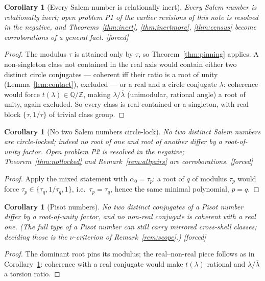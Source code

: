\documentclass[11pt]{article}
\theoremstyle{plain}
\newtheorem{corollary}[theorem]{Corollary}
\theoremstyle{definition}
\theoremstyle{remark}
\newcommand{\Q}{\mathbb{Q}}
\newcommand{\Z}{\mathbb{Z}}
\newcommand{\F}{\textnormal{[forced]}}
\begin{document}
\begin{corollary}[Every Salem number is relationally inert]
\label{cor:allinert}
Every Salem number is relationally inert; open problem P1 of the earlier
revisions of this note is resolved in the negative, and
Theorems~\ref{thm:inert}, \ref{thm:inertmore}, \ref{thm:census} become
corroborations of a general fact. \F
\end{corollary}

\begin{proof}
The modulus $\tau$ is attained only by $\tau$, so
Theorem~\ref{thm:pinning} applies. A non-singleton class not contained in
the real axis would contain either two distinct circle conjugates ---
coherent iff their ratio is a root of unity (Lemma~\ref{lem:contact}),
excluded --- or a real and a circle conjugate $\lambda$: coherence would
force $t(\lambda)\in\Q/\Z$, making $\lambda/\overline{\lambda}$
(unimodular, rational angle) a root of unity, again excluded. So every
class is real-contained or a singleton, with real block $\{\tau,1/\tau\}$
of trivial class group.
\end{proof}

\begin{corollary}[No two Salem numbers circle-lock]\label{cor:nolock}
No two distinct Salem numbers are circle-locked; indeed no root of one and
root of another differ by a root-of-unity factor. Open problem P2 is
resolved in the negative; Theorem~\ref{thm:notlocked} and
Remark~\ref{rem:allpairs} are corroborations. \F
\end{corollary}

\begin{proof}
Apply the mixed statement with $\alpha_0=\tau_p$: a root of $q$ of modulus
$\tau_p$ would force $\tau_p\in\{\tau_q,1/\tau_q,1\}$, i.e.\
$\tau_p=\tau_q$, hence the same minimal polynomial, $p=q$.
\end{proof}

\begin{corollary}[Pisot numbers]\label{cor:pisot}
No two distinct conjugates of a Pisot number differ by a root-of-unity
factor, and no non-real conjugate is coherent with a real one. (The full
type of a Pisot number can still carry mirrored cross-shell classes;
deciding those is the $\nu$-criterion of Remark~\ref{rem:scope}.) \F
\end{corollary}

\begin{proof}
The dominant root pins its modulus; the real--non-real piece follows as in
Corollary~\ref{cor:allinert}: coherence with a real conjugate would make
$t(\lambda)$ rational and $\lambda/\overline{\lambda}$ a torsion ratio.
\end{proof}
\end{document}
